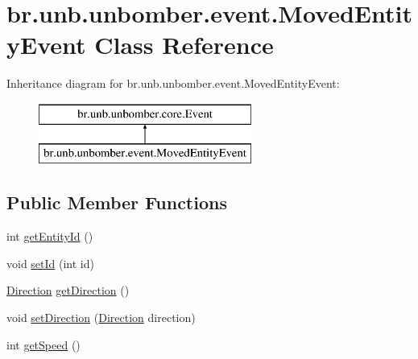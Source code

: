 \hypertarget{classbr_1_1unb_1_1unbomber_1_1event_1_1_moved_entity_event}{\section{br.\+unb.\+unbomber.\+event.\+Moved\+Entity\+Event Class Reference}
\label{classbr_1_1unb_1_1unbomber_1_1event_1_1_moved_entity_event}
}
Inheritance diagram for br.\+unb.\+unbomber.\+event.\+Moved\+Entity\+Event\+:\begin{figure}[H]
\begin{center}
\leavevmode
\includegraphics[height=2.000000cm]{classbr_1_1unb_1_1unbomber_1_1event_1_1_moved_entity_event}
\end{center}
\end{figure}
\subsection*{Public Member Functions}
\begin{DoxyCompactItemize}
\item 
int \hyperlink{classbr_1_1unb_1_1unbomber_1_1event_1_1_moved_entity_event_abd7ce416112ae527944583e57933bc52}{get\+Entity\+Id} ()
\item 
void \hyperlink{classbr_1_1unb_1_1unbomber_1_1event_1_1_moved_entity_event_a220212fccd368ae2d2e7520f2b223324}{set\+Id} (int id)
\item 
\hyperlink{enumbr_1_1unb_1_1unbomber_1_1component_1_1_direction}{Direction} \hyperlink{classbr_1_1unb_1_1unbomber_1_1event_1_1_moved_entity_event_a29cb4ca0deac2d6ac7236b3d84b29582}{get\+Direction} ()
\item 
void \hyperlink{classbr_1_1unb_1_1unbomber_1_1event_1_1_moved_entity_event_a6d5bcab50438a5f26786afe6abe2bee1}{set\+Direction} (\hyperlink{enumbr_1_1unb_1_1unbomber_1_1component_1_1_direction}{Direction} direction)
\item 
int \hyperlink{classbr_1_1unb_1_1unbomber_1_1event_1_1_moved_entity_event_a1030e19a488ff38bbee3efa8c0c30aa0}{get\+Speed} ()
\end{DoxyCompactItemize}


